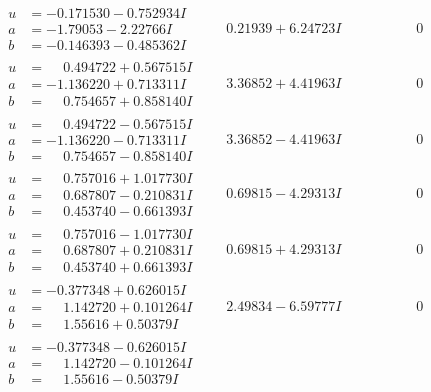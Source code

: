 \documentclass[1p]{elsarticle_modified}
\theoremstyle{definition}
\begin{document}
$$\begin{array}{c|c|c}
\begin{aligned}
u &= -0.171530 - 0.752934 I \\
a &= -1.79053 - 2.22766 I \\
b &= -0.146393 - 0.485362 I\end{aligned}
 & \phantom{-}0.21939 + 6.24723 I & \phantom{-0.000000 } 0 \\ \hline\begin{aligned}
u &= \phantom{-}0.494722 + 0.567515 I \\
a &= -1.136220 + 0.713311 I \\
b &= \phantom{-}0.754657 + 0.858140 I\end{aligned}
 & \phantom{-}3.36852 + 4.41963 I & \phantom{-0.000000 } 0 \\ \hline\begin{aligned}
u &= \phantom{-}0.494722 - 0.567515 I \\
a &= -1.136220 - 0.713311 I \\
b &= \phantom{-}0.754657 - 0.858140 I\end{aligned}
 & \phantom{-}3.36852 - 4.41963 I & \phantom{-0.000000 } 0 \\ \hline\begin{aligned}
u &= \phantom{-}0.757016 + 1.017730 I \\
a &= \phantom{-}0.687807 - 0.210831 I \\
b &= \phantom{-}0.453740 - 0.661393 I\end{aligned}
 & \phantom{-}0.69815 - 4.29313 I & \phantom{-0.000000 } 0 \\ \hline\begin{aligned}
u &= \phantom{-}0.757016 - 1.017730 I \\
a &= \phantom{-}0.687807 + 0.210831 I \\
b &= \phantom{-}0.453740 + 0.661393 I\end{aligned}
 & \phantom{-}0.69815 + 4.29313 I & \phantom{-0.000000 } 0 \\ \hline\begin{aligned}
u &= -0.377348 + 0.626015 I \\
a &= \phantom{-}1.142720 + 0.101264 I \\
b &= \phantom{-}1.55616 + 0.50379 I\end{aligned}
 & \phantom{-}2.49834 - 6.59777 I & \phantom{-0.000000 } 0 \\ \hline\begin{aligned}
u &= -0.377348 - 0.626015 I \\
a &= \phantom{-}1.142720 - 0.101264 I \\
b &= \phantom{-}1.55616 - 0.50379 I\end{aligned}

\end{array}$$
\end{document}
